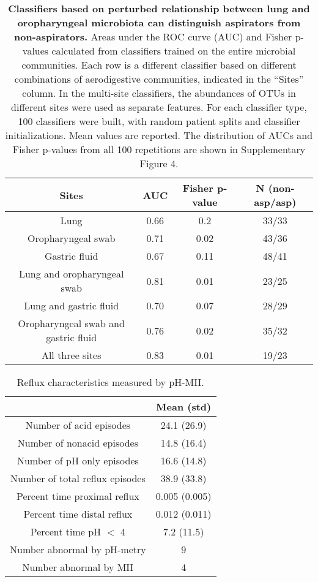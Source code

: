 \begin{table}
\begin{center}
\begin{tabular}{cccc}
  Sites & AUC & Fisher p-value & N (non-asp/asp) \\
 \midrule
Lung & 0.66	& 0.2 & 33/33 \\
Oropharyngeal swab & 0.71 & 0.02 & 43/36 \\
Gastric fluid & 0.67 & 0.11 & 48/41 \\
Lung and oropharyngeal swab & 0.81 & 0.01 & 23/25 \\
Lung and gastric fluid & 0.70 & 0.07 & 28/29 \\
Oropharyngeal swab and gastric fluid & 0.76 & 0.02 & 35/32 \\
All three sites & 0.83 & 0.01 & 19/23 \\
\bottomrule
\end{tabular}
\caption{\textbf{Classifiers based on perturbed relationship between lung and oropharyngeal microbiota can distinguish aspirators from non-aspirators.} Areas under the ROC curve (AUC) and Fisher p-values calculated from classifiers trained on the entire microbial communities. Each row is a different classifier based on different combinations of aerodigestive communities, indicated in the ``Sites'' column. In the multi-site classifiers, the abundances of OTUs in different sites were used as separate features. For each classifier type, 100 classifiers were built, with random patient splits and classifier initializations. Mean values are reported. The distribution of AUCs and Fisher p-values from all 100 repetitions are shown in Supplementary Figure 4.}\label{tab:aspiration_aucs}
\end{center}
\end{table}

\begin{table}
\begin{center}
\begin{tabular}{cc}
 & Mean (std) \\
 \midrule
Number of acid episodes & 24.1 (26.9) \\
Number of nonacid episodes & 14.8 (16.4) \\
Number of pH only episodes & 16.6 (14.8) \\
Number of total reflux episodes & 38.9 (33.8) \\
Percent time proximal reflux & 0.005 (0.005) \\
Percent time distal reflux & 0.012 (0.011) \\
Percent time pH $<$ 4 & 7.2 (11.5) \\
Number abnormal by pH-metry & 9 \\
Number abnormal by MII & 4 \\
\bottomrule
\end{tabular}
\caption{Reflux characteristics measured by pH-MII.}\label{tab:reflux}
\end{center}
\end{table}

\FloatBarrier
\newpage




%
